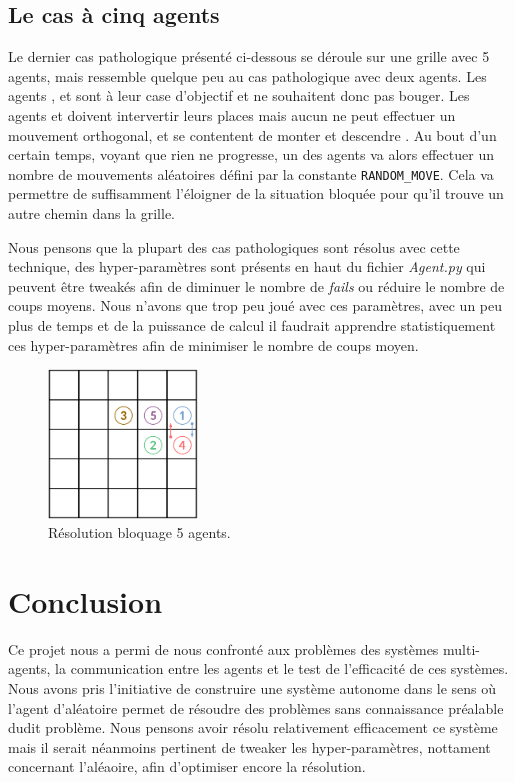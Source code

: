 \documentclass[a4paper, 12pt,twocolumn, french]{article}
\newcommand*\circled[1]{
	\tikz[baseline=(char.base)]{
		\node[shape=circle,draw,inner sep=2pt] (char) {#1};
	}
}
\begin{document}
\subsection{Le cas à cinq agents}

Le dernier cas pathologique présenté ci-dessous se déroule sur une grille avec 5 agents, mais ressemble quelque peu au cas pathologique avec deux agents. Les agents \circled{2}, \circled{3} et \circled{5} sont à leur case d'objectif et ne souhaitent donc pas bouger. Les agents \circled{1} et \circled{4} doivent \og{} intervertir \fg{} leurs places mais aucun ne peut effectuer un mouvement orthogonal, et se contentent de \og{} monter \fg{} et \og{} descendre \fg{}. Au bout d'un certain temps, voyant que rien ne progresse, un des agents va alors effectuer un nombre de mouvements aléatoires défini par la constante \texttt{RANDOM\_MOVE}. Cela va permettre de suffisamment l'éloigner de la situation bloquée pour qu'il trouve un autre chemin dans la grille.

Nous pensons que la plupart des cas pathologiques sont résolus avec cette technique, des hyper-paramètres sont présents en haut du fichier \textit{Agent.py} qui peuvent être tweakés afin de diminuer le nombre de \textit{fails} ou réduire le nombre de coups moyens. Nous n'avons que trop peu joué avec ces paramètres, avec un peu plus de temps et de la puissance de calcul il faudrait apprendre statistiquement ces hyper-paramètres afin de minimiser le nombre de coups moyen. 

\begin{figure}[h]
	\centering
	\includegraphics[width=150px]{images/5_agents.png}
	\caption{Résolution bloquage 5 agents.}
\end{figure}

\section{Conclusion}

Ce projet nous a permi de nous confronté aux problèmes des systèmes multi-agents, la communication entre les agents et le test de l'efficacité de ces systèmes. Nous avons pris l'initiative de construire une système autonome dans le sens où l'agent d'aléatoire permet de résoudre des problèmes sans connaissance préalable dudit problème. 
Nous pensons avoir résolu relativement efficacement ce système mais il serait néanmoins pertinent de tweaker les hyper-paramètres, nottament concernant l'aléaoire, afin d'optimiser encore la résolution.
\end{document}
